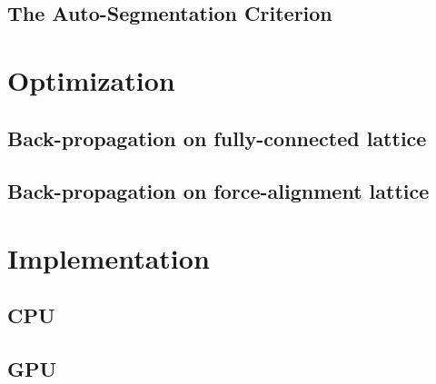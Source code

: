 \documentclass[a4paper]{article}
\begin{document}
\subsection{The Auto-Segmentation Criterion}

\section{Optimization}

\subsection{Back-propagation on fully-connected lattice}

\subsection{Back-propagation on force-alignment lattice}

\section{Implementation}

\subsection{CPU}

\subsection{GPU}
\end{document}
